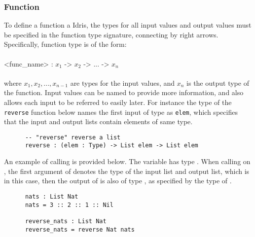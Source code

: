 
\subsubsection*{Function}
To define a function a Idris, the types for all input values and output values must be specified in the function type signature, connecting by right arrows. Specifically, function type is of the form: 
\\\\
\tab <func\_name> : $x_1$ -> $x_2$ -> ... ->  $x_n$
\\\\
where $x_1, x_2, ..., x_{n-1}$ are types for the input values, and $x_n$ is the output type of the function. Input values can be named to provide more information, and also allows each input to be referred to easily later. For instance the type of the \texttt{reverse} function below names the first input of type  as \texttt{elem}, which specifies that the input and output lists contain elements of same type. 
\begin{lstlisting}
      -- "reverse" reverse a list
      reverse : (elem : Type) -> List elem -> List elem
\end{lstlisting}

An example of calling  is provided below. The variable  has type . When calling  on , the first argument of  denotes the type of the input list and output list, which is  in this case, then the output of  is also of type , as specified by the type of . 
\begin{lstlisting}
      nats : List Nat
      nats = 3 :: 2 :: 1 :: Nil
        
      reverse_nats : List Nat
      reverse_nats = reverse Nat nats
\end{lstlisting}

